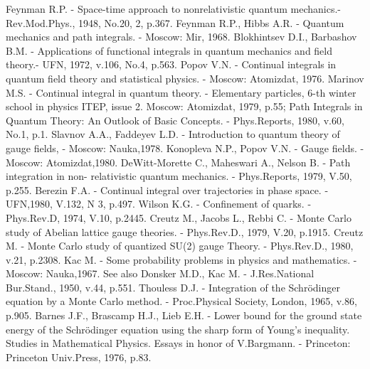 \documentclass[11pt]{article}
\begin{document}
\begin{thebibliography}{99}
  Feynman R.P. - Space-time approach to nonrelativistic quantum                         mechanics.-
             Rev.Mod.Phys., 1948, No.20, 2, p.367.
  Feynman R.P., Hibbs A.R. - Quantum mechanics and path
             integrals. - Moscow: Mir, 1968.
  Blokhintsev D.I., Barbashov B.M. -
             Applications of functional  integrals in quantum mechanics
             and field theory.- UFN, 1972, v.106, No.4, p.563.
  Popov V.N. - Continual integrals in quantum field theory
             and statistical physics. - Moscow: Atomizdat, 1976.
  Marinov M.S. - Continual integral in quantum theory. -
             Elementary particles,  6-th winter school in physics ITEP,
             issue 2. Moscow: Atomizdat, 1979, p.55;
             Path Integrals in Quantum Theory: An Outlook of Basic Concepts. -
             Phys.Reports, 1980, v.60, No.1, p.1.
  Slavnov A.A., Faddeyev L.D. - Introduction to quantum theory of
             gauge fields, - Moscow: Nauka,1978.
  Konopleva N.P., Popov V.N. - Gauge fields. - Moscow: Atomizdat,1980.
  DeWitt-Morette C., Maheswari A., Nelson B. - Path integration in non-
             relativistic quantum mechanics. - Phys.Reports, 1979, V.50, p.255.
  Berezin F.A. - Continual integral over trajectories in phase space. -               UFN,1980, V.132, N 3, p.497.
 Wilson K.G. - Confinement of quarks. - Phys.Rev.D, 1974, V.10, p.2445.
 Creutz M., Jacobs L., Rebbi C. - Monte Carlo study of Abelian
             lattice gauge  theories. - Phys.Rev.D., 1979, V.20, p.1915.
 Creutz M. - Monte Carlo study of quantized SU(2) gauge Theory.
             - Phys.Rev.D., 1980, v.21, p.2308.
 Kac M. -  Some probability problems in physics and mathematics.
             - Moscow: Nauka,1967. See also
              Donsker M.D., Kac M. - J.Res.National Bur.Stand., 1950, v.44,
              p.551.
 Thouless D.J. - Integration of the  Schr\"{o}dinger equation by
             a Monte Carlo method. - Proc.Physical Society, London, 1965, v.86, p.905.
 Barnes J.F., Brascamp H.J., Lieb E.H. - Lower bound for the
             ground state  energy of the Schr\"{o}dinger equation using the
             sharp form of Young's inequality. Studies in Mathematical
             Physics. Essays in honor of V.Bargmann. -
             Princeton: Princeton Univ.Press, 1976, p.83.

\end{thebibliography}
\end{document}
